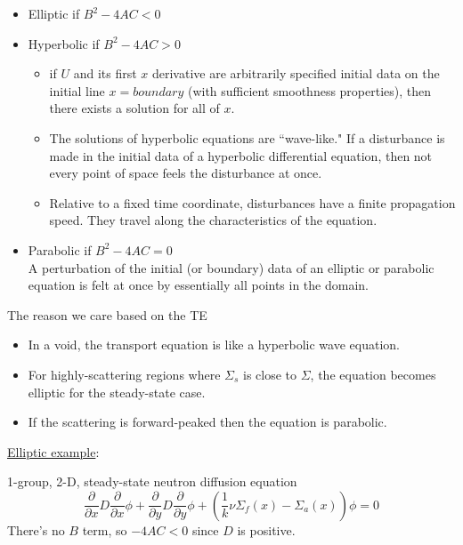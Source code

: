 \documentclass[12pt]{article}
\newcommand{\Macro}{\ensuremath{\Sigma}}
\begin{document}
\begin{itemize}
\item Elliptic if $B^2 - 4 AC < 0$
\item Hyperbolic if $B^2 - 4 AC > 0$
  \begin{itemize}
  \item if $U$ and its first $x$ derivative are arbitrarily specified initial data on the initial line $x = boundary$ (with sufficient smoothness properties), then there exists a solution for all of $x$.
  \item The solutions of hyperbolic equations are ``wave-like." If a disturbance is made in the initial data of a hyperbolic differential equation, then not every point of space feels the disturbance at once.
  \item Relative to a fixed time coordinate, disturbances have a finite propagation speed. They travel along the characteristics of the equation.
  \end{itemize}
\item Parabolic if $B^2 - 4 AC = 0$\\ A perturbation of the initial (or boundary) data of an elliptic or parabolic equation is felt at once by essentially all points in the domain.
\end{itemize}

\noindent The reason we care based on the TE
\begin{itemize}
\item In a void, the transport equation is like a hyperbolic wave equation. 
\item For highly-scattering regions where $\Macro_{s}$ is close to $\Macro$, the equation becomes elliptic for the steady-state case. 
\item If the scattering is forward-peaked then the equation is parabolic.
\end{itemize}

\vspace*{1em}
\noindent \underline{Elliptic example}:

1-group, 2-D, steady-state neutron diffusion equation
%
\begin{equation}
\frac{\partial}{\partial x}D\frac{\partial}{\partial x}\phi + \frac{\partial}{\partial y}D\frac{\partial}{\partial y}\phi + (\frac{1}{k} \nu \Macro_f(x) - \Macro_a(x)) \phi = 0 \nonumber
\end{equation}
%
There's no $B$ term, so $-4AC < 0$ since $D$ is positive.
\end{document}
